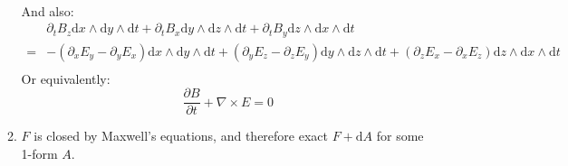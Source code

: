 \documentclass[12pt,a4]{article}
\newcommand{\e}{\mathrm{d}}
\begin{document}
\begin{enumerate}
\begin{enumerate}
\begin{align*}
        \end{align*}
        And also:
        \begin{align*}
          &\partial_t B_z  \e x \wedge \e y \wedge \e t + \partial_t B_x  \e y \wedge \e z \wedge \e t + \partial_t B_y  \e z \wedge \e x \wedge \e t \\
          =& - (\partial_x E_y - \partial_y E_x) \e x \wedge \e y \wedge \e t + (\partial_y  E_z - \partial_z  E_y)\e y \wedge \e z \wedge \e t + (\partial_z  E_x - \partial_x  E_z)\e z \wedge \e x \wedge \e t \\
        \end{align*}
        Or equivalently:
        \begin{equation*}
          \frac{\partial B}{\partial t} + \nabla \times E = 0
        \end{equation*}
      \item
        $F$ is closed by Maxwell's equations, and therefore exact $F+ \e A$ for some 1-form $A$.
    \end{enumerate}
\end{enumerate}
\end{document}
